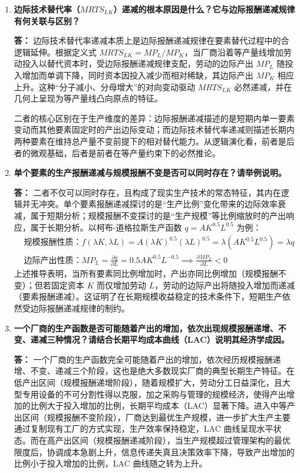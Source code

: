 \begin{enumerate}[label=\textbf{\arabic*.}, leftmargin=*]
		\item \textbf{边际技术替代率（$MRTS_{LK}$）递减的根本原因是什么？它与边际报酬递减规律有何关联与区别？}
		
		\textbf{答：}
		边际技术替代率递减本质上是边际报酬递减规律在要素替代过程中的合逻辑延伸。根据定义式 $MRTS_{LK} = MP_L / MP_K$，当厂商沿着等产量线增加劳动投入以替代资本时，受边际报酬递减规律支配，劳动的边际产出 $MP_L$ 随投入增加而单调下降，同时资本因投入减少而相对稀缺，其边际产出 $MP_K$ 相应上升。这种“分子减小、分母增大”的对向变动驱动 $MRTS_{LK}$ 必然递减，并在几何上呈现为等产量线凸向原点的特征。
		
		二者的核心区别在于生产维度的差异：边际报酬递减描述的是短期内单一要素变动而其他要素固定时的产出边际变动；而边际技术替代率递减则描述长期内两种要素在维持总产量不变前提下的相对替代能力。从逻辑演化看，前者是后者的微观基础，后者是前者在等产量约束下的必然推论。
		
		\item \textbf{单个要素的生产报酬递减与规模报酬不变是否可以同时存在？请举例说明。}
		
		\textbf{答：}
		二者不仅可以同时存在，且构成了现实生产技术的常态特征，其内在逻辑并无冲突。单个要素报酬递减探讨的是“生产比例”变化带来的边际效率衰减，属于短期分析；规模报酬不变探讨的是“生产规模”等比例缩放时的产出响应，属于长期分析。以柯布-道格拉斯生产函数 $q = AK^{0.5}L^{0.5}$ 为例：
		\[
		\begin{aligned}
			&\text{规模报酬性质：} f(\lambda K, \lambda L) = A(\lambda K)^{0.5}(\lambda L)^{0.5} = \lambda (AK^{0.5}L^{0.5}) = \lambda q \\
			&\text{边际产出性质：} MP_L = \frac{\partial q}{\partial L} = 0.5 A K^{0.5} L^{-0.5} \implies \frac{\partial MP_L}{\partial L} < 0
		\end{aligned}
		\]
		上述推导表明，当所有要素同比例增加时，产出亦同比例增加（规模报酬不变）；但若固定资本 $K$ 而仅增加劳动 $L$，劳动的边际产出将随投入增加而递减（要素报酬递减）。这证明了在长期规模收益稳定的技术条件下，短期生产依然受边际报酬递减规律的制约。
		
		\item \textbf{一个厂商的生产函数是否可能随着产出的增加，依次出现规模报酬递增、不变、递减三种情况？请结合长期平均成本曲线（LAC）说明其经济学成因。}
		
		\textbf{答：}
		一个厂商的生产函数完全可能随着产出的增加，依次经历规模报酬递增、不变、递减三个阶段，这也是绝大多数现实厂商的典型长期生产特征。在低产出区间（规模报酬递增阶段），随着规模扩大，劳动分工日益深化，且大型专用设备的不可分割性得以克服，加之采购与管理的规模经济，使得产出增加的比例大于投入增加的比例，长期平均成本（LAC）显著下降。进入中等产出区间（规模报酬不变阶段），厂商达到最优生产规模，进一步扩大生产主要通过复制现有工厂的方式实现，生产效率保持稳定，LAC 曲线呈现水平状态。而在高产出区间（规模报酬递减阶段），当生产规模超过管理架构的最优限度后，协调成本急剧上升，信息传递失真且决策效率下降，导致产出增加的比例小于投入增加的比例，LAC 曲线随之转为上升。
		

\end{enumerate}

